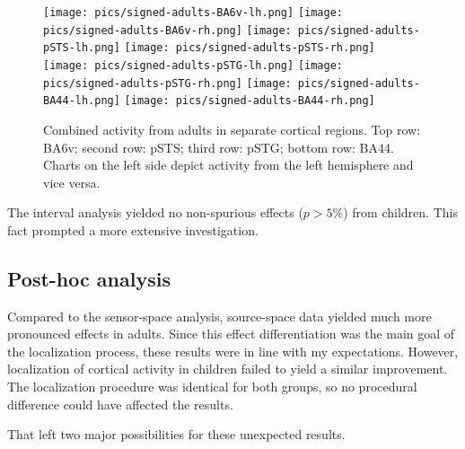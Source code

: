 \begin{figure}[h]
\begin{center}
\texttt{[image: pics/signed-adults-BA6v-lh.png]}
\texttt{[image: pics/signed-adults-BA6v-rh.png]}
\texttt{[image: pics/signed-adults-pSTS-lh.png]}
\texttt{[image: pics/signed-adults-pSTS-rh.png]}
\texttt{[image: pics/signed-adults-pSTG-lh.png]}
\texttt{[image: pics/signed-adults-pSTG-rh.png]}
\texttt{[image: pics/signed-adults-BA44-lh.png]}
\texttt{[image: pics/signed-adults-BA44-rh.png]}
\caption{\label{4.3.activity.adults.ventral} Combined activity from adults in separate cortical regions. Top row: BA6v; second row: pSTS; third row: pSTG; bottom row: BA44. Charts on the left side depict activity from the left hemisphere and vice versa.}
\end{center}
\end{figure}

\clearpage

The interval analysis yielded no non-spurious effects ($p > 5\%$) from children.
This fact prompted a more extensive investigation.

\subsection{Post-hoc analysis}

Compared to the sensor-space analysis, source-space data yielded much more pronounced effects in adults.
Since this effect differentiation was the main goal of the localization process, these results were in line with my expectations.
However, localization of cortical activity in children failed to yield a similar improvement.
The localization procedure was identical for both groups, so no procedural difference could have affected the results.

That left two major possibilities for these unexpected results.

